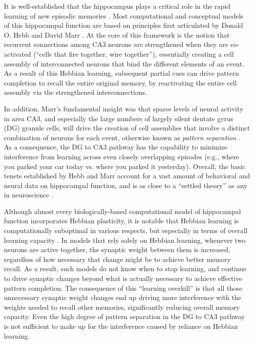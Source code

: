 \documentclass[11pt,twoside]{article}
\newif\myifpdf
\begin{document}
It is well-established that the hippocampus plays a critical role in the rapid learning of new episodic memories \citep{EichenbaumYonelinasRanganath07}.  Most computational and conceptual models of this hippocampal function are based on principles first articulated by Donald O. Hebb and David Marr \citep{Hebb49,Marr71,McNaughtonNadel90,McClellandMcNaughtonOReilly95}.  At the core of this framework is the notion that recurrent connections among CA3 neurons are strengthened when they are co-activated (``cells that fire together, wire together''), essentially creating a cell assembly of interconnected neurons that bind the different elements of an event.  As a result of this Hebbian learning, subsequent partial cues can drive pattern completion to recall the entire original memory, by reactivating the entire cell assembly via the strengthened interconnections.

In addition, Marr's fundamental insight was that sparse levels of neural activity in area CA3, and especially the large numbers of largely silent dentate gyrus (DG) granule cells, will drive the creation of cell assemblies that involve a distinct combination of neurons for each event, otherwise known as \emph{pattern separation} \citep{Marr71,OReillyMcClelland94,YassaStark11}.  As a consequence, the DG to CA3 pathway has the capability to minimize interference from learning across even closely overlapping episodes (e.g., where you parked your car today vs. where you parked it yesterday).  Overall, the basic tenets established by Hebb and Marr account for a vast amount of behavioral and neural data on hippocampal function, and is as close to a ``settled theory'' as any in neuroscience \citep{OReillyBhattacharyyaHowardEtAl14,YonelinasRanganathEkstromEtAl19,MORE}.
 
Although almost every biologically-based computational model of hippocampal function incorporates Hebbian plasticity, it is notable that Hebbian learning is computationally suboptimal in various respects, but especially in terms of overall learning capacity \citep{Abu-MostafaSt.Jacques85,TrevesRolls91}.  In models that rely solely on Hebbian learning, whenever two neurons are active together, the synaptic weight between them is increased, regardless of how necessary that change might be to achieve better memory recall.  As a result, such models do not know when to stop learning, and continue to drive synaptic changes beyond what is actually necessary to achieve effective pattern completion.  The consequence of this ``learning overkill'' is that all those unnecessary synaptic weight changes end up driving more interference with the weights needed to recall other memories, significantly reducing overall memory capacity. Even the high degree of pattern separation in the DG to CA3 pathway is not sufficient to make up for the interference caused by reliance on Hebbian learning. 
\end{document}
